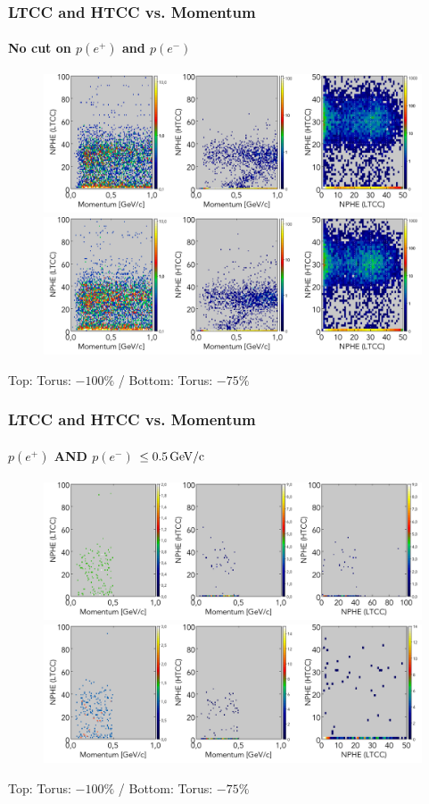 \documentclass[xcolor=table, xcolor=dvipsnames]{beamer}
\begin{document}
      
      \begin{frame}
        \frametitle{LTCC and HTCC vs. Momentum}
        \footnotesize
          \framesubtitle{No cut on $p(e^+)$ and $p(e^-)$}
           
           \begin{figure}
             \includegraphics[width=1\textwidth,height=0.25\textwidth]{triggerStudies_Tor1_LTCC_HTCC_P.png}\\
             \includegraphics[width=1\textwidth,height=0.25\textwidth]{triggerStudies_Tor075_cut05_LTCC_HTCC_P.png}
           \end{figure}
           Top: Torus: $-100\%$ / Bottom: Torus: $-75\%$
\end{frame}

\begin{frame}
	        \frametitle{LTCC and HTCC vs. Momentum}
	        \footnotesize
           \framesubtitle{$p(e^+)$ AND $p(e^-)$ $\le 0.5\,\rm{GeV/c}$}
           
           \begin{figure}
             \includegraphics[width=1\textwidth,height=0.25\textwidth]{triggerStudies_Tor1_cut05_LTCC_HTCC_P_IN.png}\\
             \includegraphics[width=1\textwidth,height=0.25\textwidth]{triggerStudies_Tor075_cut05_LTCC_HTCC_P_IN.png}
           \end{figure}
           
           Top: Torus: $-100\%$ / Bottom: Torus: $-75\%$
\end{frame}
\end{document}
